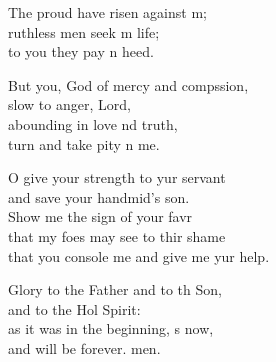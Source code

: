 \begin{psalmverse}
\begin{patverse}
The proud have risen against m;\Flex\\
ruthless men seek m life;\Med\\
to you they pay n heed.

But you, God of mercy and compssion,\Med\\
slow to anger,  Lord,\\
abounding in love nd truth,\Med\\
turn and take pity n me.

O give your strength to yur servant\Med\\
and save your handmid’s son.\\
Show me the sign of your favr\Flex\\
that my foes may see to thir shame\Med\\
that you console me and give me yur help.

Glory to the Father and to th Son,\Med\\
and to the Hol Spirit:\\
as it was in the beginning, \pointup{\i}s now,\Med\\
and will be forever. men.
  \end{patverse}
\end{psalmverse}
